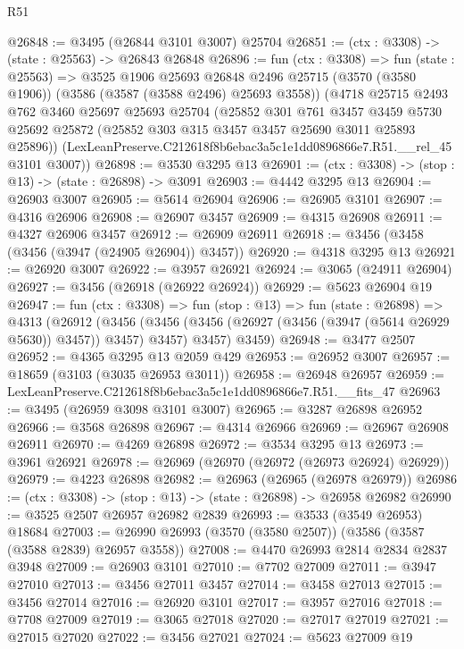 \begin{lexlean}{R51}
\begin{coremodule}
@26848 := @3495 (@26844 @3101 @3007) @25704
@26851 := (ctx : @3308) -> (state : @25563) -> @26843 @26848
@26896 := fun (ctx : @3308) =>
  fun (state : @25563) =>
  @3525
    @1906
    @25693
    @26848
    @2496
    @25715
    (@3570 (@3580 @1906))
    (@3586 (@3587 (@3588 @2496) @25693 @3558))
    (@4718
      @25715
      @2493
      @762
      @3460
      @25697
      @25693
      @25704
      (@25852
        @301
        @761
        @3457
        @3459
        @5730
        @25692
        @25872
        (@25852 @303 @315 @3457 @3457 @25690 @3011 @25893 @25896))
      (LexLeanPreserve.C212618f8b6ebac3a5c1e1dd0896866e7.R51.__rel_45 @3101 @3007))
@26898 := @3530 @3295 @13
@26901 := (ctx : @3308) -> (stop : @13) -> (state : @26898) -> @3091
@26903 := @4442 @3295 @13
@26904 := @26903 @3007
@26905 := @5614 @26904
@26906 := @26905 @3101
@26907 := @4316 @26906
@26908 := @26907 @3457
@26909 := @4315 @26908
@26911 := @4327 @26906 @3457
@26912 := @26909 @26911
@26918 := @3456 (@3458 (@3456 (@3947 (@24905 @26904)) @3457))
@26920 := @4318 @3295 @13
@26921 := @26920 @3007
@26922 := @3957 @26921
@26924 := @3065 (@24911 @26904)
@26927 := @3456 (@26918 (@26922 @26924))
@26929 := @5623 @26904 @19
@26947 := fun (ctx : @3308) =>
  fun (stop : @13) =>
  fun (state : @26898) =>
  @4313
    (@26912
      (@3456 (@3456 (@3456 (@26927 (@3456 (@3947 (@5614 @26929 @5630)) @3457)) @3457) @3457) @3457)
      @3459)
@26948 := @3477 @2507
@26952 := @4365 @3295 @13 @2059 @429
@26953 := @26952 @3007
@26957 := @18659 (@3103 (@3035 @26953 @3011))
@26958 := @26948 @26957
@26959 := LexLeanPreserve.C212618f8b6ebac3a5c1e1dd0896866e7.R51.__fits_47
@26963 := @3495 (@26959 @3098 @3101 @3007)
@26965 := @3287 @26898 @26952
@26966 := @3568 @26898
@26967 := @4314 @26966
@26969 := @26967 @26908 @26911
@26970 := @4269 @26898
@26972 := @3534 @3295 @13
@26973 := @3961 @26921
@26978 := @26969 (@26970 (@26972 (@26973 @26924) @26929))
@26979 := @4223 @26898
@26982 := @26963 (@26965 (@26978 @26979))
@26986 := (ctx : @3308) -> (stop : @13) -> (state : @26898) -> @26958 @26982
@26990 := @3525 @2507 @26957 @26982 @2839
@26993 := @3533 (@3549 @26953) @18684
@27003 := @26990 @26993 (@3570 (@3580 @2507)) (@3586 (@3587 (@3588 @2839) @26957 @3558))
@27008 := @4470 @26993 @2814 @2834 @2837 @3948
@27009 := @26903 @3101
@27010 := @7702 @27009
@27011 := @3947 @27010
@27013 := @3456 @27011 @3457
@27014 := @3458 @27013
@27015 := @3456 @27014
@27016 := @26920 @3101
@27017 := @3957 @27016
@27018 := @7708 @27009
@27019 := @3065 @27018
@27020 := @27017 @27019
@27021 := @27015 @27020
@27022 := @3456 @27021
@27024 := @5623 @27009 @19

\end{coremodule}
\end{lexlean}
